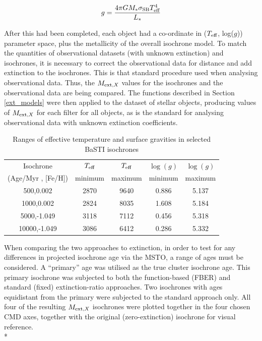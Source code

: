 \documentclass[12pt, a4paper]{report}
\begin{document}
\begin{equation}
\label{gravity_LT_calc}
g = \frac{4 \pi G M_{*} \sigma_{\textnormal{SB}} T_{\textnormal{eff}}^{4}}{L_{*}}
\end{equation}

After this had been completed, each object had a co-ordinate in ($T_{\textnormal{eff}}$, log($g$)) parameter space, plus the metallicity of the overall isochrone model. To match the quantities of observational datasets (with unknown extinction) and isochrones, it is necessary to correct the observational data for distance and add extinction to the isochrones. This is that standard procedure used when analysing observational data. Thus, the $M_{\textnormal{ext},X}$ values for the isochrones and the observational data are being compared. The functions described in Section \ref{ext_models} were then applied to the dataset of stellar objects, producing values of $M_{\textnormal{ext},X}$ for each filter for all objects, as is the standard for analysing observational data with unknown extinction coefficients.

\begin{table}
\begin{center}
\begin{tabular}{ccccc}
\hline
Isochrone & $T_{\textnormal{eff}}$ & $T_{\textnormal{eff}}$ & $\log(g)$ & $\log(g)$ \\
(Age/Myr , [Fe/H]) & minimum & maximum & minimum & maximum \\
\hline
500,0.002 & 2870 & 9640 & 0.886 & 5.137 \\
1000,0.002 & 2824 & 8035 & 1.608 & 5.184 \\
5000,-1.049 & 3118 & 7112 & 0.456 & 5.318 \\
10000,-1.049 & 3086 & 6412 & 0.286 & 5.332 \\
\hline
\end{tabular}
\caption{Ranges of effective temperature and surface gravities in selected BaSTI isochrones}
\label{variable_ranges}
\end{center}
\end{table}

When comparing the two approaches to extinction, in order to test for any differences in projected isochrone age via the MSTO, a range of ages must be considered. A ``primary'' age was utilised as the true cluster isochrone age. This primary isochrone was subjected to both the function-based (FBER) and standard (fixed) extinction-ratio approaches. Two isochrones with ages equidistant from the primary were subjected to the standard approach only. All four of the resulting $M_{\textnormal{ext},X}$ isochrones were plotted together in the four chosen CMD axes, together with the original (zero-extinction) isochrone for visual reference.\\*
\end{document}

